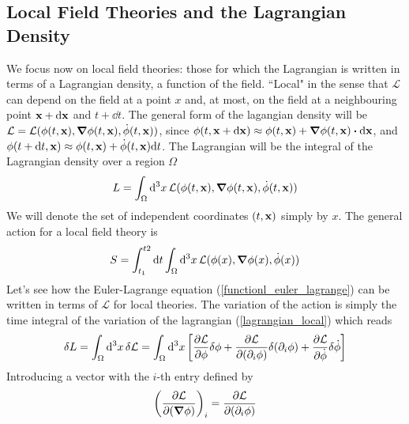 \subsection{Local Field Theories and the Lagrangian Density}
We focus now on local field theories: those for which the Lagrangian is written in terms of a Lagrangian density, a function of the field. 
``Local" in the sense that $\mathcal{L}$ can depend on the field at a point $x$ and, at most, on the field at a neighbouring point $\vb{x}+\dd \vb{x}$ and $t+\dd t$. The general form of the lagangian density will be $\mathcal{L}=\mathcal{L}(\phi(t,\vb{x}),\grad\phi(t,\vb{x}),\dot{\phi}(t,\vb{x}))$, since $\phi(t,\vb{x}+\dd \vb{x})\approx\phi(t,\vb{x})+\grad\phi(t,\vb{x})\vdot\dd\vb{x}$, and $\phi(t+\dd t,\vb{x})\approx\phi(t,\vb{x})+\dot{\phi}(t,\vb{x})\dd t$. The Lagrangian will be the integral of the Lagrangian density over a region $\Omega$
\begin{equation}
   L=\int_\Omega\dd^3 x\,\mathcal{L}(\phi(t,\vb{x}),\grad\phi(t,\vb{x}),\dot{\phi}(t,\vb{x}))
   \label{lagrangian_local}
\end{equation}
We will denote the set of independent coordinates $(t,\vb{x})$ simply by $x$.
The general action for a local field theory is 
\begin{equation}
    S=\int_{t_1}^{t2}\dd t\int_{\Omega}\dd^3 x\,\mathcal{L}(\phi(x),\grad{\phi}(x),\dot{\phi}(x))
\end{equation}
Let's see how the Euler-Lagrange equation (\ref{functionl_euler_lagrange}) can be written in terms of $\mathcal{L}$ for local theories. The variation of the action is simply the time integral of the variation of the lagrangian (\ref{lagrangian_local}) which reads
\begin{equation}
    \begin{aligned}
\delta L=\int_{\Omega}\dd^3x\,\delta\mathcal{L}=\int_{\Omega}\dd^3x\,\qty[\pdv{\mathcal{L}}{\phi}\delta\phi+\pdv{\mathcal{L}}{(\partial_i\phi)}\delta(\partial_i\phi)+\pdv{\mathcal{L}}{\dot{\phi}}\delta\dot{\phi}]
    \end{aligned}
    \label{varL}
\end{equation}
Introducing a vector with the $i$-th entry defined by
\begin{equation}
    \qty(\pdv{\mathcal{L}}{(\grad\phi)})_i=\pdv{\mathcal{L}}{(\partial_i\phi)}
    \label{del_grad}
\end{equation}
